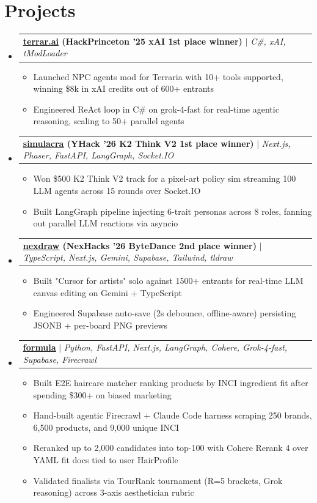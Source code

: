 \documentclass[letterpaper,11pt]{article}
\makeatletter
\newcommand{\resumeItem}[1]{
  \item\small{
    {#1 \vspace{-4pt}}
  }
}
\newcommand{\resumeProjectHeading}[2]{
    \item
    \begin{tabular*}{0.97\textwidth}[t]{l@{\extracolsep{\fill}}r}
      \small#1 & #2 \\
    \end{tabular*}\vspace{-7pt}
}
\newcommand{\resumeSubHeadingListStart}{\begin{itemize}[leftmargin=0.15in, label={}]}
\newcommand{\resumeSubHeadingListEnd}{\end{itemize}}
\newcommand{\resumeItemListStart}{\begin{itemize}}
\newcommand{\resumeItemListEnd}{\end{itemize}\vspace{-8pt}}
\makeatother
\begin{document}
\section{\textbf{Projects}}
    \resumeSubHeadingListStart
    \resumeProjectHeading
  {\textbf{\href{https://github.com/SlothfulDreams/terrar.ai}{\underline{terrar.ai}} (HackPrinceton '25 xAI 1st place winner)}
  $|$
  \emph{C\#, xAI, tModLoader}
  }
  {}
  \resumeItemListStart
    \resumeItem{
        Launched NPC agents mod for Terraria with 10+ tools supported, winning \$8k in xAI credits out of 600+ entrants
    }
    \resumeItem{
      Engineered ReAct loop in C\# on grok-4-fast for real-time agentic reasoning, scaling to 50+ parallel agents
    }
  \resumeItemListEnd
     \resumeProjectHeading
  {\textbf{\href{https://github.com/AdamPSU/simulacra}{\underline{simulacra}} (YHack '26 K2 Think V2 1st place winner)}
  $|$
  \emph{Next.js, Phaser, FastAPI, LangGraph, Socket.IO}
  }{}
  \resumeItemListStart
    \resumeItem{
        Won \$500 K2 Think V2 track for a pixel-art policy sim streaming 100 LLM agents across 15 rounds over Socket.IO
    }
    \resumeItem{
      Built LangGraph pipeline injecting 6-trait personas across 8 roles, fanning out parallel LLM reactions via asyncio
    }
  \resumeItemListEnd
    \resumeProjectHeading
  {\textbf{\href{https://github.com/AdamPSU/maestro}{\underline{nexdraw}} (NexHacks '26 ByteDance 2nd place winner)}
  $|$
  \emph{TypeScript, Next.js, Gemini, Supabase, Tailwind, tldraw}
  }
  {}
  \resumeItemListStart
    \resumeItem{
    Built "Cursor for artists" solo against 1500+ entrants for real-time LLM canvas editing on Gemini + TypeScript
    }
    \resumeItem{
    Engineered Supabase auto-save (2s debounce, offline-aware) persisting JSONB + per-board PNG previews
    }
  \resumeItemListEnd
    \resumeProjectHeading
  {\textbf{\href{https://github.com/AdamPSU/ForMula}{\underline{formula}}}
  $|$
  \emph{Python, FastAPI, Next.js, LangGraph, Cohere, Grok-4-fast, Supabase, Firecrawl}
  }
  {}
  \resumeItemListStart
    \resumeItem{
    Built E2E haircare matcher ranking products by INCI ingredient fit after spending \$300+ on biased marketing
    }
    \resumeItem{
    Hand-built agentic Firecrawl + Claude Code harness scraping 250 brands, 6,500 products, and 9,000 unique INCI
    }
    \resumeItem{
    Reranked up to 2,000 candidates into top-100 with Cohere Rerank 4 over YAML fit docs tied to user HairProfile
    }
    \resumeItem{
    Validated finalists via TourRank tournament (R=5 brackets, Grok reasoning) across 3-axis aesthetician rubric
    }
  \resumeItemListEnd
    \resumeSubHeadingListEnd
\end{document}
